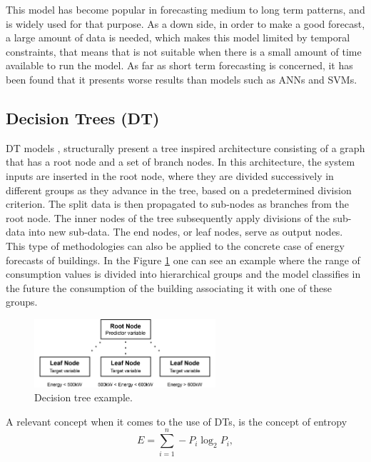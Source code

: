 This model has become popular in forecasting medium to long term patterns, and is widely used for that purpose. As a down side, in order to make a good forecast, a large amount of data is needed, which makes this model limited by temporal constraints, that means that is not suitable when there is a small amount of time available to run the model. As far as short term forecasting is concerned, it has been found that it presents worse results than models such as \ac{ANN}s and \ac{SVM}s.

\subsection{Decision Trees (DT)}

\ac{DT} models \cite{dt1}, structurally present a tree inspired architecture consisting of a graph that has a root node and a set of branch nodes. In this architecture, the system inputs are inserted in the root node, where they are divided successively in different groups as they advance in the tree, based on a predetermined division criterion. The split data is then propagated to sub-nodes as branches from the root node. The inner nodes of the tree subsequently apply divisions of the sub-data into new sub-data. The end nodes, or leaf nodes, serve as output nodes. This type of methodologies can also be applied to the concrete case of energy forecasts of buildings. In the Figure \ref{dt} one can see an example where the range of consumption values is divided into hierarchical groups and the model classifies in the future the consumption of the building associating it with one of these groups.


\begin{figure}[h!]
    \centering
    \begin{center}
    \includegraphics[width=0.6\textwidth]{Images/DT.png}
    \caption{Decision tree example.}
    \label{dt}
    \end{center}
\end{figure}

A relevant concept when it comes to the use of \ac{DT}s, is the concept of entropy
\begin{equation}
       E=\sum_{i=1}^n -P_i\log_2P_i,
\label{entropy}
\end{equation}


